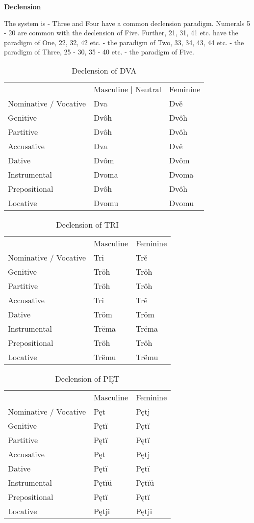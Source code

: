 \textbf{Declension}

The system is - Three and Four have a common declension paradigm. Numerals 5 - 20 are common with the declension of Five. Further, 21, 31, 41 etc. have the paradigm of One, 22, 32, 42 etc. - the paradigm of Two, 33, 34, 43, 44 etc. - the paradigm of Three, 25 - 30, 35 - 40 etc. - the paradigm of Five.

\begin{table}[!htb]
	\caption{Declension of DVA}
	\begin{tabular}{lll}
		& Masculine | Neutral & Feminine \\
		Nominative / Vocative & Dva & Dvě \\
		Genitive & Dvôh & Dvôh \\
		Partitive & Dvôh & Dvôh \\
		Accusative & Dva & Dvě \\
		Dative & Dvôm & Dvôm \\
		Instrumental & Dvoma & Dvoma \\
		Prepositional & Dvôh & Dvôh \\
		Locative & Dvomu & Dvomu \\
	\end{tabular}
\end{table}

\begin{table}[!htb]
	\caption{Declension of TRI}
	\begin{tabular}{lll}
		& Masculine & Feminine \\
		Nominative / Vocative & Tri & Trě \\
		Genitive & Tröh & Tröh \\
		Partitive & Tröh & Tröh \\
		Accusative & Tri & Trě \\
		Dative & Tröm & Tröm \\
		Instrumental & Trëma & Trëma \\
		Prepositional & Tröh & Tröh \\
		Locative & Trëmu & Trëmu \\
	\end{tabular}
\end{table}

\begin{table}[!htb]
	\caption{Declension of PĘT}
	\begin{tabular}{lll}
		& Masculine & Feminine \\
		Nominative / Vocative & Pęt & Pętj \\
		Genitive & Pętï & Pętï \\
		Partitive & Pętï & Pętï \\
		Accusative & Pęt & Pętj \\
		Dative & Pętï & Pętï \\
		Instrumental & Pętïü & Pętïü \\
		Prepositional & Pętï & Pętï \\
		Locative & Pętji & Pętji \\
	\end{tabular}
\end{table}




